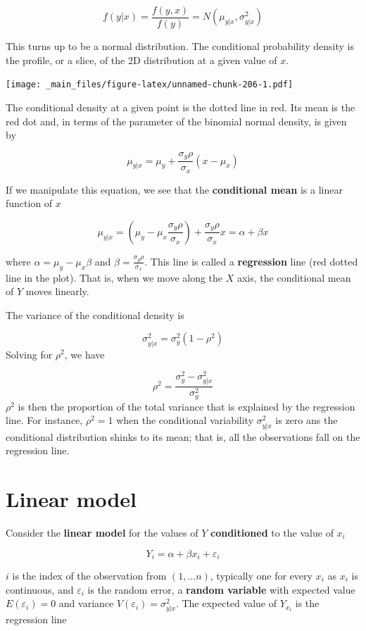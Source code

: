 \documentclass[
]{book}
\begin{document}
\[f(y|x)=\frac{f(y,x)}{f(y)}
=N(\mu_{y|x}, \sigma^2_{y|x})\]

This turns up to be a normal distribution. The conditional probability density is the profile, or a slice, of the 2D distribution at a given value of \(x\).

\texttt{[image: \_main\_files/figure-latex/unnamed-chunk-206-1.pdf]}

The conditional density at a given point is the dotted line in red. Its mean is the red dot and, in terms of the parameter of the binomial normal density, is given by

\[\mu_{y|x}=\mu_y+\frac{\sigma_y\rho}{\sigma_x}(x-\mu_x)\]

If we manipulate this equation, we see that the \textbf{conditional mean} is a linear function of \(x\)

\[\mu_{y|x}=(\mu_y-\mu_x \frac{\sigma_y\rho}{\sigma_x})+\frac{\sigma_y \rho}{\sigma_x} x=\alpha + \beta x\]

where \(\alpha=\mu_y-\mu_x \beta\) and \(\beta=\frac{\sigma_y \rho}{\sigma_x}\). This line is called a \textbf{regression} line (red dotted line in the plot). That is, when we move along the \(X\) axis, the conditional mean of \(Y\) moves linearly.

The variance of the conditional density is

\[\sigma^2_{y|x}= \sigma_y^2(1-\rho^2)\]
Solving for \(\rho^2\), we have

\[\rho^2=\frac{\sigma_y^2-\sigma^2_{y|x}}{\sigma_y^2} \]
\(\rho^2\) is then the proportion of the total variance that is explained by the regression line. For instance, \(\rho^2=1\) when the conditional variability \(\sigma^2_{y|x}\) is zero ans the conditional distribution shinks to its mean; that is, all the observations fall on the regression line.

\hypertarget{linear-model-2}{%
\section{Linear model}\label{linear-model-2}}

Consider the \textbf{linear model} for the values of \(Y\) \textbf{conditioned} to the value of \(x_i\)

\[Y_i = \alpha + \beta x_i +\varepsilon_{i}\]

\(i\) is the index of the observation from \((1,...n)\), typically one for every \(x_i\) as \(x_i\) is continuous, and \(\varepsilon_{i}\) is the random error, a \textbf{random variable} with expected value \(E(\varepsilon_{i})=0\) and variance \(V(\varepsilon_{i})=\sigma_{y|x}^2\). The expected value of \(Y_{x_i}\) is the regression line
\end{document}
